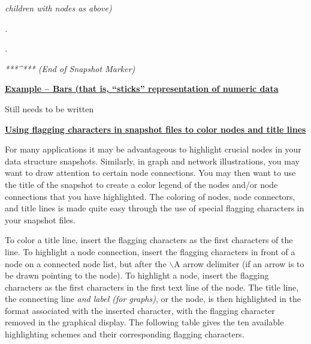 \documentclass[12pt]{article}
\begin{document}
\textit{{\footnotesize{}       children with nodes as above)}}

\textit{{\footnotesize{}                        .}}

\textit{{\footnotesize{}                        .}}

\textit{{\footnotesize{}                ***\^{}*** (End of Snapshot Marker)}}{\footnotesize{}   }



\begin{flushleft}
\textbf{\uline{{\footnotesize{}Example -- Bars (that is, ``sticks'' representation of numeric data}}}\textbf{{\footnotesize{} }}
\end{flushleft}


{\footnotesize{} Still needs to be written}


\begin{flushleft}
\textbf{\uline{{\footnotesize{}
Using flagging characters in snapshot files to color
 nodes and title lines 
}}}\textbf{{\footnotesize{} }}
\end{flushleft}



{\footnotesize{}For many applications it may be advantageous to highlight crucial nodes in your data structure snapshots.  Similarly, in graph and network illustrations, you may want to draw attention to certain node connections.  You may then want to use the title of the snapshot to create a color legend of the nodes and/or node connections that you have highlighted.  The coloring of nodes, node connectors, and title lines is made quite easy through the use of  special flagging characters in your snapshot files.  }



{\footnotesize{}To color a title line, insert the flagging characters as the first characters of the line. To highlight a node connection, insert the flagging characters in front of a node on a connected node list, but after the \ensuremath{\backslash}A arrow delimiter (if an arrow is to be drawn pointing to the node).  To highlight a node, insert the flagging characters as the first characters in the first text line of the node.   The title line, the connecting line }\textit{{\footnotesize{}and label (for graphs)}}{\footnotesize{},  or the node, is then highlighted in the format associated with the inserted character, with the flagging character removed in the graphical display. The following table gives the ten available highlighting schemes and their corresponding flagging characters.     }
\end{document}
